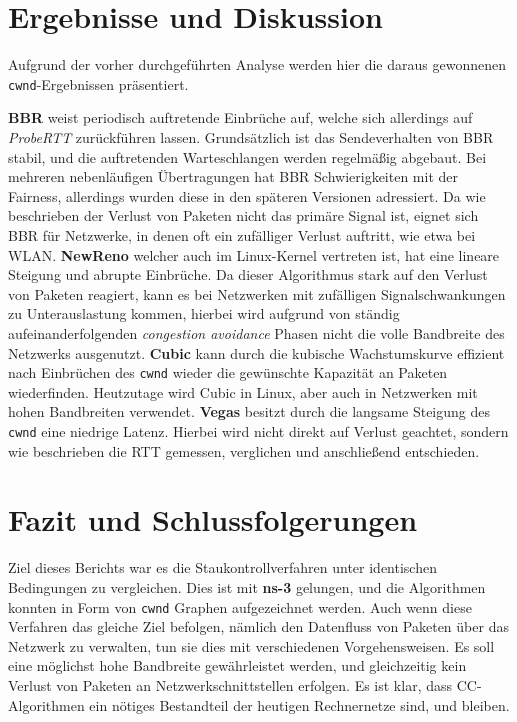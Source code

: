 \documentclass[paper=a4,fontsize=12pt,ngerman]{scrartcl}
\begin{document}
\section{Ergebnisse und Diskussion}
Aufgrund der vorher durchgeführten Analyse werden hier die daraus gewonnenen \texttt{cwnd}-Ergebnissen präsentiert. 

\textbf{BBR} weist periodisch auftretende Einbrüche auf, welche sich allerdings auf \textit{ProbeRTT} zurückführen lassen.
Grundsätzlich ist das Sendeverhalten von BBR stabil, und die auftretenden Warteschlangen werden regelmäßig abgebaut.
Bei mehreren nebenläufigen Übertragungen hat BBR Schwierigkeiten mit der Fairness, allerdings wurden diese in den späteren
Versionen adressiert. Da wie beschrieben der Verlust von Paketen nicht das primäre Signal ist, eignet sich BBR für 
Netzwerke, in denen oft ein zufälliger Verlust auftritt, wie etwa bei WLAN. \newline
\textbf{NewReno} welcher auch im Linux-Kernel vertreten ist, hat eine lineare Steigung und abrupte Einbrüche.
Da dieser Algorithmus stark auf den Verlust von Paketen reagiert, kann es bei Netzwerken mit zufälligen Signalschwankungen
zu Unterauslastung kommen, hierbei wird aufgrund von ständig aufeinanderfolgenden \textit{congestion avoidance} Phasen
nicht die volle Bandbreite des Netzwerks ausgenutzt. \newline
\textbf{Cubic} kann durch die kubische Wachstumskurve effizient nach Einbrüchen des \texttt{cwnd} wieder die gewünschte 
Kapazität an Paketen wiederfinden. Heutzutage wird Cubic in Linux, aber auch in Netzwerken mit hohen Bandbreiten verwendet.\cite{pandorafms} \newline
\textbf{Vegas} besitzt durch die langsame Steigung des \texttt{cwnd} eine niedrige Latenz.
Hierbei wird nicht direkt auf Verlust geachtet, sondern wie beschrieben die RTT gemessen, verglichen und anschließend entschieden.



\section{Fazit und Schlussfolgerungen}
Ziel dieses Berichts war es die Staukontrollverfahren unter identischen Bedingungen zu vergleichen.
Dies ist mit \textbf{ns-3} gelungen, und die Algorithmen konnten in Form von \texttt{cwnd} Graphen aufgezeichnet
werden.
Auch wenn diese Verfahren das gleiche Ziel befolgen, nämlich den Datenfluss von Paketen über das Netzwerk zu 
verwalten, tun sie dies mit verschiedenen Vorgehensweisen. Es soll eine möglichst hohe Bandbreite gewährleistet
werden, und gleichzeitig kein Verlust von Paketen an Netzwerkschnittstellen erfolgen. Es ist klar, dass CC-Algorithmen
ein nötiges Bestandteil der heutigen Rechnernetze sind, und bleiben.
\end{document}
